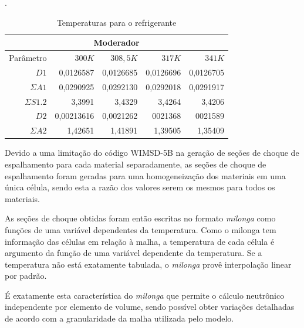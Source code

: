 \begin{table}[htb]
  \centering
  \caption[Temperaturas para o refrigerante.]{Temperaturas para o refrigerante}.
  \label{tab:temp-coolant}
  \begin{tabular}{r r r r r}
    \multicolumn{5}{c}{Moderador} \\
    \hline
    Parâmetro & $300K$ & $308,5K$ & $317K$ & $341K$ \\
    \hline
    $D1$ & 0,0126587 & 0,0126685 & 0,0126696 & 0,0126705\\
    $\Sigma A1$ & 0,0290925 & 0,0292130 & 0,0292018 & 0,0291917\\
    $\Sigma S1.2$ & 3,3991 & 3,4329 & 3,4264 & 3,4206\\
    \hline
    $D2$ & 0,00213616 & 0,0021262 & 0021368 & 0021589\\
    $\Sigma A2$ & 1,42651 & 1,41891 & 1,39505 & 1,35409\\
    \hline
  \end{tabular}
\end{table}


Devido a uma limitação do código WIMSD-5B na geração de seções de choque de espalhamento
para cada material separadamente, as seções de choque de
espalhamento foram geradas para uma homogeneização dos materiais em uma única célula,
sendo esta a razão dos valores serem os mesmos para todos os materiais.

%
%
As seções de choque obtidas foram então escritas no formato \textit{milonga} como
funções de uma variável dependentes da temperatura. Como o milonga tem informação
das células em relação à malha, a temperatura de cada célula é argumento da
função de uma variável dependente da temperatura. Se a temperatura não está
exatamente tabulada, o \textit{milonga} provê interpolação linear por padrão.

É exatamente esta característica do \textit{milonga} que permite o cálculo neutrônico
independente por elemento de volume, sendo possível obter variações detalhadas
de acordo com a granularidade da malha utilizada pelo modelo.
